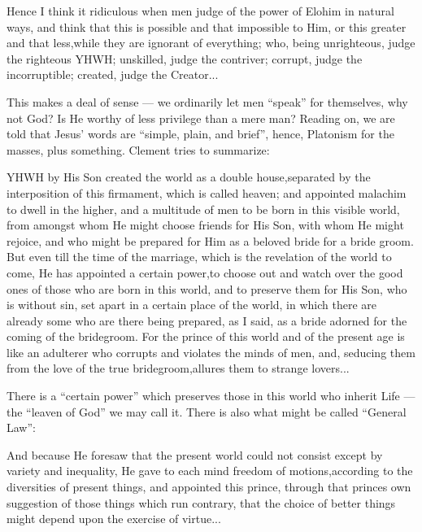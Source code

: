 \begin{quotex}
Hence I think it ridiculous when men judge of the power of Elohim in natural ways, and think that this is possible and that impossible to Him, or this greater and that less,while they are ignorant of everything; who, being unrighteous, judge the righteous YHWH; unskilled, judge the contriver; corrupt, judge the incorruptible; created, judge the Creator... 
\end{quotex}

This makes a deal of sense --- we ordinarily let men ``speak'' for themselves, why not God? Is He worthy of less privilege than a mere man? Reading on, we are told that Jesus' words are ``simple, plain, and brief'', hence, Platonism for the masses, plus something. Clement tries to summarize:

\begin{quotex}
YHWH by His Son created the world as a double house,separated by the interposition of this firmament, which is called heaven; and appointed malachim to dwell in the higher, and a multitude of men to be born in this visible world, from amongst whom He might choose friends for His Son, with whom He might rejoice, and who might be prepared for Him as a beloved bride for a bride groom. But even till the time of the marriage, which is the revelation of the world to come, He has appointed a certain power,to choose out and watch over the good ones of those who are born in this world, and to preserve them for His Son, who is without sin, set apart in a certain place of the world, in which there are already some who are there being prepared, as I said, as a bride adorned for the coming of the bridegroom. For the prince of this world and of the present age is like an adulterer who corrupts and violates the minds of men, and, seducing them from the love of the true bridegroom,allures them to strange lovers... 
\end{quotex}


There is a ``certain power'' which preserves those in this world who inherit Life --- the ``leaven of God'' we may call it. There is also what might be called ``General Law'':

\begin{quotex}
And because He foresaw that the present world could not consist except by variety and inequality, He gave to each mind freedom of motions,according to the diversities of present things, and appointed this prince, through that princes own suggestion of those things which run contrary, that the choice of better things might depend upon the exercise of virtue... 
\end{quotex}


